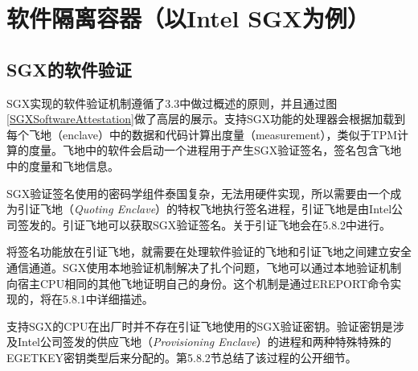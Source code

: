 \section{软件隔离容器（以Intel SGX为例）}

\subsection{}
\subsection{}
\subsection{}
\subsection{}
\subsection{}
\subsection{}
\subsection{}
\subsection{SGX的软件验证}
SGX实现的软件验证机制遵循了3.3中做过概述的原则，并且通过图\ref{SGXSoftwareAttestation}做了高层的展示。支持SGX功能的处理器会根据加载到每个飞地（enclave）中的数据和代码计算出度量（measurement），类似于TPM计算的度量。飞地中的软件会启动一个进程用于产生SGX验证签名，签名包含飞地中的度量和飞地信息。

SGX验证签名使用的密码学组件泰国复杂，无法用硬件实现，所以需要由一个成为引证飞地（\textit{Quoting Enclave}）的特权飞地执行签名进程，引证飞地是由Intel公司签发的。引证飞地可以获取SGX验证签名。关于引证飞地会在5.8.2中进行。

将签名功能放在引证飞地，就需要在处理软件验证的飞地和引证飞地之间建立安全通信通道。SGX使用本地验证机制解决了扎个问题，飞地可以通过本地验证机制向宿主CPU相同的其他飞地证明自己的身份。这个机制是通过EREPORT命令实现的，将在5.8.1中详细描述。

支持SGX的CPU在出厂时并不存在引证飞地使用的SGX验证密钥。验证密钥是涉及Intel公司签发的供应飞地（\textit{Provisioning Enclave}）的进程和两种特殊特殊的EGETKEY密钥类型后来分配的。第5.8.2节总结了该过程的公开细节。

